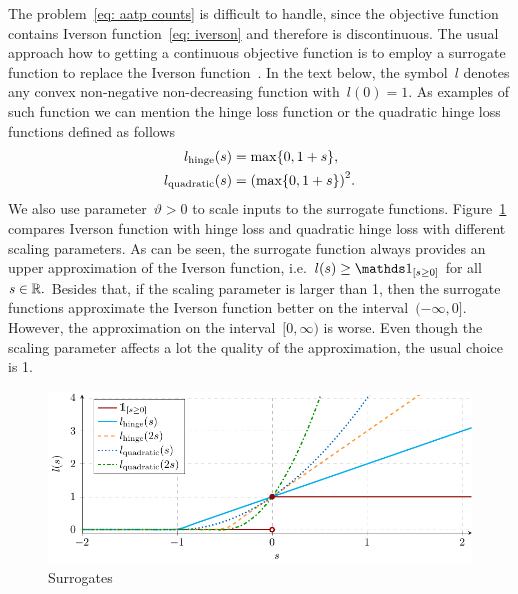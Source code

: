 The problem~\eqref{eq: aatp counts} is difficult to handle, since the objective function contains Iverson function~\eqref{eq: iverson} and therefore is discontinuous. The usual approach how to getting a continuous objective function is to employ a surrogate function to replace the Iverson function~\cite{li2014top, grill2016learning}. In the text below, the symbol~$l$ denotes any convex non-negative non-decreasing function with~$l(0) = 1$. As examples of such function we can mention the hinge loss function or the quadratic hinge loss functions defined as follows
\begin{equation}\label{eq: surrogates}
  \begin{aligned}
    l_{\text{hinge}}(s) & = \max\Brac[c]{0, 1 + s}, \\
    l_{\text{quadratic}}(s) & = \Brac{\max\Brac[c]{0, 1 + s}}^2.\\
  \end{aligned}
\end{equation}
We also use parameter~$\vartheta > 0$ to scale inputs to the surrogate functions. Figure~\ref{fig: surrogates} compares Iverson function with hinge loss and quadratic hinge loss with different scaling parameters. As can be seen, the surrogate function always provides an upper approximation of the Iverson function, i.e.~$l(s) \ge \Iverson{s \ge 0}$ for all~$s \in \mathbb{R}.$ Besides that, if the scaling parameter is larger than 1, then the surrogate functions approximate the Iverson function better on the interval~$(-\infty, 0]$. However, the approximation on the interval~$[0, \infty)$ is worse. Even though the scaling parameter affects a lot the quality of the approximation, the usual choice is 1.

\begin{figure}[t]
  \centering
  \includegraphics[width = \linewidth]{images/surrogates.pdf}
  \caption{Surrogates}
  \label{fig: surrogates}
\end{figure}

